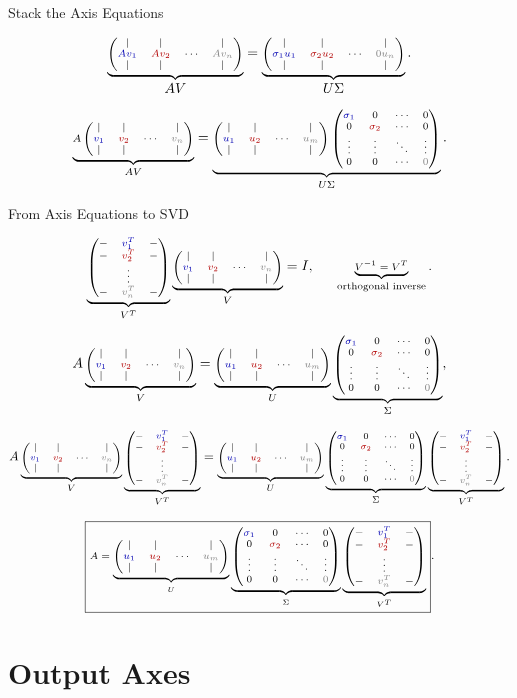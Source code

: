 \documentclass[10pt]{beamer}
\theoremstyle{definition}
\newcommand{\rd}[1]{{\color{red!70!black}#1}}
\newcommand{\bl}[1]{{\color{blue!70!black}#1}}
\newcommand{\gry}[1]{{\color{gray}#1}}
\newcommand{\Vcols}{\begin{pmatrix}|&|& &|\\ \bl{v_1}&\rd{v_2}&\cdots&\gry{v_n}\\ |&|& &|\end{pmatrix}}
\newcommand{\Ucols}{\begin{pmatrix}|&|& &|\\ \bl{u_1}&\rd{u_2}&\cdots&\gry{u_m}\\ |&|& &|\end{pmatrix}}
\newcommand{\Vrows}{\begin{pmatrix}-&\bl{v_1^T}&-\\ -&\rd{v_2^T}&-\\ &\vdots&\\ -&\gry{v_n^T}&-\end{pmatrix}}
\newcommand{\Sigdisplay}{\begin{pmatrix}\bl{\sigma_1}&0&\cdots&0\\ 0&\rd{\sigma_2}&\cdots&0\\ \vdots&\vdots&\ddots&\vdots\\ 0&0&\cdots&\gry{0}\end{pmatrix}}
\newcommand{\svdproduct}{\underbrace{\Ucols}_{U}\underbrace{\Sigdisplay}_{\Sigma}\underbrace{\Vrows}_{V^T}}
\begin{document}
\begin{frame}[shrink=12]{Stack the Axis Equations}

\[
\scriptsize
\underbrace{
\begin{pmatrix}
|&|& &|\\
\bl{Av_1}&\rd{Av_2}&\cdots&\gry{Av_n}\\
|&|& &|
\end{pmatrix}}_{\displaystyle AV}
=
\underbrace{
\begin{pmatrix}
|&|& &|\\
\bl{\sigma_1u_1}&\rd{\sigma_2u_2}&\cdots&\gry{0u_n}\\
|&|& &|
\end{pmatrix}}_{\displaystyle U\Sigma}.
\]

\vfill

\[
\scriptsize
\underbrace{A\Vcols}_{AV}
=
\underbrace{\Ucols\Sigdisplay}_{U\Sigma}.
\]

\end{frame}


\begin{frame}[shrink=20]{From Axis Equations to SVD}

\[
\scriptsize
\underbrace{\Vrows}_{V^T}
\underbrace{\Vcols}_{V}
=I,
\qquad
\underbrace{V^{-1}=V^T}_{\text{orthogonal inverse}}.
\]

\vfill

\[
\scriptsize
A\underbrace{\Vcols}_{V}
=
\underbrace{\Ucols}_{U}
\underbrace{\Sigdisplay}_{\Sigma},
\]

\[
\scriptsize
A
\underbrace{\Vcols}_{V}
\underbrace{\Vrows}_{V^T}
=
\underbrace{\Ucols}_{U}
\underbrace{\Sigdisplay}_{\Sigma}
\underbrace{\Vrows}_{V^T}.
\]

\[
\scriptsize
\boxed{
A=
\svdproduct
}.
\]

\end{frame}


\section{Output Axes}
\end{document}
